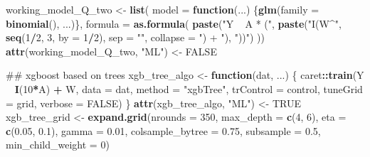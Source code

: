 \documentclass[]{article}
\newenvironment{Shaded}{\begin{snugshade}}{\end{snugshade}}
\newcommand{\ControlFlowTok}[1]{\textcolor[rgb]{0.13,0.29,0.53}{\textbf{#1}}}
\newcommand{\DataTypeTok}[1]{\textcolor[rgb]{0.13,0.29,0.53}{#1}}
\newcommand{\DecValTok}[1]{\textcolor[rgb]{0.00,0.00,0.81}{#1}}
\newcommand{\FloatTok}[1]{\textcolor[rgb]{0.00,0.00,0.81}{#1}}
\newcommand{\KeywordTok}[1]{\textcolor[rgb]{0.13,0.29,0.53}{\textbf{#1}}}
\newcommand{\NormalTok}[1]{#1}
\newcommand{\OperatorTok}[1]{\textcolor[rgb]{0.81,0.36,0.00}{\textbf{#1}}}
\newcommand{\OtherTok}[1]{\textcolor[rgb]{0.56,0.35,0.01}{#1}}
\newcommand{\StringTok}[1]{\textcolor[rgb]{0.31,0.60,0.02}{#1}}
\theoremstyle{definition}
\theoremstyle{definition}
\theoremstyle{definition}
\theoremstyle{remark}
\begin{document}
\begin{Shaded}
\begin{Highlighting}[]
\NormalTok{working_model_Q_two <-}\StringTok{ }\KeywordTok{list}\NormalTok{(}
  \DataTypeTok{model =} \ControlFlowTok{function}\NormalTok{(...) \{}\KeywordTok{glm}\NormalTok{(}\DataTypeTok{family =} \KeywordTok{binomial}\NormalTok{(), ...)\},}
  \DataTypeTok{formula =} \KeywordTok{as.formula}\NormalTok{(}
    \KeywordTok{paste}\NormalTok{(}\StringTok{"Y ~ A * ("}\NormalTok{,}
          \KeywordTok{paste}\NormalTok{(}\StringTok{"I(W^"}\NormalTok{, }\KeywordTok{seq}\NormalTok{(}\DecValTok{1}\OperatorTok{/}\DecValTok{2}\NormalTok{, }\DecValTok{3}\NormalTok{, }\DataTypeTok{by =} \DecValTok{1}\OperatorTok{/}\DecValTok{2}\NormalTok{), }\DataTypeTok{sep =} \StringTok{""}\NormalTok{, }\DataTypeTok{collapse =} \StringTok{") + "}\NormalTok{),}
          \StringTok{"))"}\NormalTok{)}
\NormalTok{  ))}
\KeywordTok{attr}\NormalTok{(working_model_Q_two, }\StringTok{"ML"}\NormalTok{) <-}\StringTok{ }\OtherTok{FALSE}

\NormalTok{## xgboost based on trees}
\NormalTok{xgb_tree_algo <-}\StringTok{ }\ControlFlowTok{function}\NormalTok{(dat, ...) \{}
\NormalTok{  caret}\OperatorTok{::}\KeywordTok{train}\NormalTok{(Y }\OperatorTok{~}\StringTok{ }\KeywordTok{I}\NormalTok{(}\DecValTok{10}\OperatorTok{*}\NormalTok{A) }\OperatorTok{+}\StringTok{ }\NormalTok{W,}
               \DataTypeTok{data =}\NormalTok{ dat,}
               \DataTypeTok{method =} \StringTok{"xgbTree"}\NormalTok{,}
               \DataTypeTok{trControl =}\NormalTok{ control,}
               \DataTypeTok{tuneGrid =}\NormalTok{ grid,}
               \DataTypeTok{verbose =} \OtherTok{FALSE}\NormalTok{)  }
\NormalTok{\}}
\KeywordTok{attr}\NormalTok{(xgb_tree_algo, }\StringTok{"ML"}\NormalTok{) <-}\StringTok{ }\OtherTok{TRUE}
\NormalTok{xgb_tree_grid <-}\StringTok{ }\KeywordTok{expand.grid}\NormalTok{(}\DataTypeTok{nrounds =} \DecValTok{350}\NormalTok{,}
                             \DataTypeTok{max_depth =} \KeywordTok{c}\NormalTok{(}\DecValTok{4}\NormalTok{, }\DecValTok{6}\NormalTok{),}
                             \DataTypeTok{eta =} \KeywordTok{c}\NormalTok{(}\FloatTok{0.05}\NormalTok{, }\FloatTok{0.1}\NormalTok{),}
                             \DataTypeTok{gamma =} \FloatTok{0.01}\NormalTok{,}
                             \DataTypeTok{colsample_bytree =} \FloatTok{0.75}\NormalTok{,}
                             \DataTypeTok{subsample =} \FloatTok{0.5}\NormalTok{,}
                             \DataTypeTok{min_child_weight =} \DecValTok{0}\NormalTok{)}


\end{Highlighting}
\end{Shaded}
\end{document}
